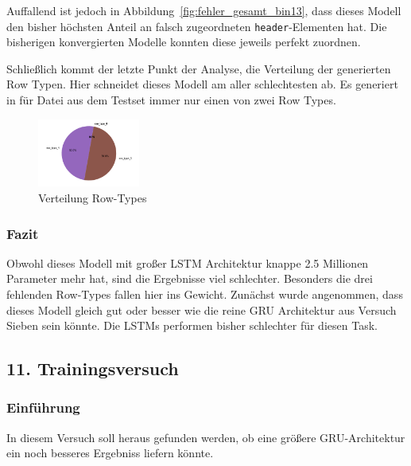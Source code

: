 \documentclass[pdftex,a4paper,halfparskip, article]{scrartcl}
\begin{document}
\begin{figure}
\begin{minipage}{.33\textwidth}
  \label{fig:fehler_schlechteste20_bin13}
\end{minipage}%
\end{figure}

Auffallend ist jedoch in Abbildung~\ref{fig:fehler_gesamt_bin13}, dass dieses Modell den bisher höchsten Anteil an falsch zugeordneten \texttt{header}-Elementen hat. Die bisherigen konvergierten Modelle konnten diese jeweils perfekt zuordnen. 

Schließlich kommt der letzte Punkt der Analyse, die Verteilung der generierten Row Typen. Hier schneidet dieses Modell am aller schlechtesten ab. Es generiert in für Datei aus dem Testset immer nur einen von zwei Row Types. 

\begin{figure}[h]
\label{fig:bin13_row_type}

\centering
\includegraphics[width=0.3\textwidth]{predictions_bin13_predicted_row_type_distribution}
\caption{Verteilung Row-Types}
\end{figure}


\subsubsection*{Fazit}

Obwohl dieses Modell mit großer LSTM Architektur knappe 2.5 Millionen Parameter mehr hat, sind die Ergebnisse viel schlechter. Besonders die drei fehlenden Row-Types fallen hier ins Gewicht. Zunächst wurde angenommen, dass dieses Modell gleich gut oder besser wie die reine GRU Architektur aus Versuch Sieben sein könnte. Die LSTMs performen bisher schlechter für diesen Task. 




\subsection{11. Trainingsversuch}


\subsubsection*{Einführung}
In diesem Versuch soll heraus gefunden werden, ob eine größere GRU-Architektur ein noch besseres Ergebniss liefern könnte.
\end{document}
